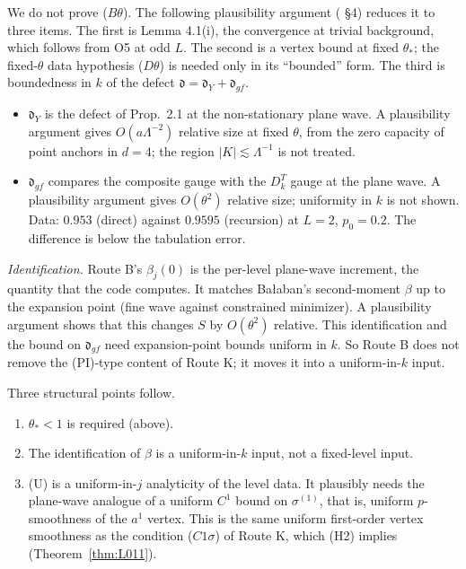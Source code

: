 \begin{remark}
We do not prove ($B\theta$). The following plausibility argument ( \S4) reduces it to three items. The first is Lemma 4.1(i), the convergence at trivial background, which follows from O5 at odd $L$. The second is a vertex bound at fixed $\theta_*$; the fixed-$\theta$ data hypothesis ($D\theta$) is needed only in its ``bounded'' form. The third is boundedness in $k$ of the defect $\mathfrak d=\mathfrak d_Y+\mathfrak d_{gf}$.
\begin{itemize}
\item $\mathfrak d_Y$ is the defect of Prop.\ 2.1 at the non-stationary plane wave. A plausibility argument gives $O(a\Lambda^{-2})$ relative size at fixed $\theta$, from the zero capacity of point anchors in $d=4$; the region $|K|\lesssim\Lambda^{-1}$ is not treated.
\item $\mathfrak d_{gf}$ compares the composite gauge with the $D_k^T$ gauge at the plane wave. A plausibility argument gives $O(\theta^2)$ relative size; uniformity in $k$ is not shown. Data: $0.953$ (direct) against $0.9595$ (recursion) at $L=2$, $p_0=0.2$. The difference is below the tabulation error.
\end{itemize}
\emph{Identification.} Route B's $\beta_j(0)$ is the per-level plane-wave increment, the quantity that the code computes. It matches Ba{\l}aban's second-moment $\beta$ up to the expansion point (fine wave against constrained minimizer). A plausibility argument shows that this changes $S$ by $O(\theta^2)$ relative. This identification and the bound on $\mathfrak d_{gf}$ need expansion-point bounds uniform in $k$. So Route B does not remove the (PI)-type content of Route K; it moves it into a uniform-in-$k$ input.
\end{remark}

Three structural points follow.
\begin{enumerate}
\item $\theta_*<1$ is required (above).
\item The identification of $\beta$ is a uniform-in-$k$ input, not a fixed-level input.
\item (U) is a uniform-in-$j$ analyticity of the level data. It plausibly needs the plane-wave analogue of a uniform $C^1$ bound on $\sigma^{(1)}$, that is, uniform $p$-smoothness of the $a^1$ vertex. This is the same uniform first-order vertex smoothness as the condition ($C1\sigma$) of Route K, which (H2) implies (Theorem~\ref{thm:L011}).
\end{enumerate}

